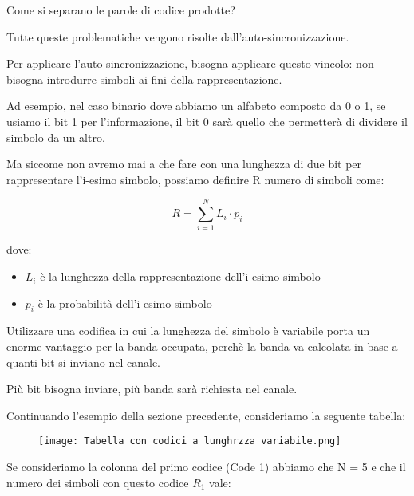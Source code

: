 Come si separano le parole di codice prodotte? \newline 

Tutte queste problematiche vengono risolte dall'auto-sincronizzazione. \newline 

Per applicare l'auto-sincronizzazione, bisogna applicare questo vincolo: 
non bisogna introdurre simboli ai fini della rappresentazione. \newline 

Ad esempio, nel caso binario dove abbiamo un alfabeto composto da 0 o 1, se usiamo il bit 1 per l'informazione, il bit 0 sarà quello che permetterà di dividere il simbolo da un altro. \newline 

Ma siccome non avremo mai a che fare con una lunghezza di due bit per rappresentare l'i-esimo simbolo, 
possiamo definire R numero di simboli come: 

{
    \Large 
    \begin{equation}
        R = \sum_{i = 1}^{N} L_i \cdot p_i
    \end{equation}
}

dove: 

\begin{itemize}
    \item $L_i$ è la lunghezza della rappresentazione dell'i-esimo simbolo 
    \item $p_i$ è la probabilità dell'i-esimo simbolo
\end{itemize}

Utilizzare una codifica in cui la lunghezza del simbolo è variabile porta un enorme vantaggio per la banda occupata, 
perchè la banda va calcolata in base a quanti bit si inviano nel canale. \newline 

Più bit bisogna inviare, più banda sarà richiesta nel canale. \newline 

Continuando l'esempio della sezione precedente, 
consideriamo la seguente tabella: 

\begin{figure}[h]
    \centering
    \texttt{[image: Tabella con codici a lunghrzza variabile.png]}
\end{figure} 

Se consideriamo la colonna del primo codice (Code 1) abbiamo che N = 5 e che il numero dei simboli con questo codice $R_1$ vale: 

